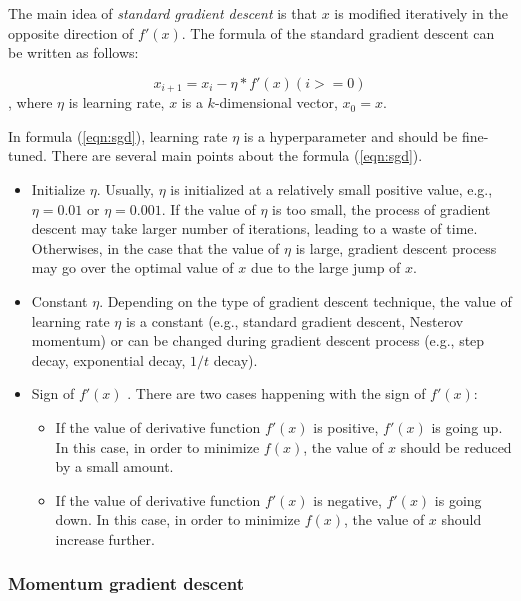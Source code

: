 \documentclass[12pt]{article}
\begin{document}
The main idea of \textit{standard gradient descent }is that $x$ is modified iteratively in the opposite direction of $f'(x)$. The formula of the standard gradient descent can be written as follows:

\begin{equation}
	\label{eqn:sgd}
	x_{i+1} = x_{i} - \eta * f'(x) (i >= 0)
\end{equation}
, where $\eta$ is learning rate, $x$ is a $k$-dimensional vector, $x_0 = x$.

In formula (\ref{eqn:sgd}), learning rate $\eta$ is a hyperparameter and should be fine-tuned. There are several main points about the formula (\ref{eqn:sgd}).

\begin{itemize}
	\item Initialize $\eta$.  Usually, $\eta$ is initialized at a relatively small positive value, e.g., $\eta = 0.01$ or $\eta = 0.001$. If the value of $\eta$ is too small, the process of gradient descent may take larger number of iterations, leading to a waste of time. Otherwises, in the case that the value of $\eta$ is large, gradient descent process may go over the optimal value of $x$ due to the large jump of $x$.
	\item Constant $\eta$. Depending on the type of gradient descent technique, the value of learning rate $\eta$ is a constant (e.g., standard gradient descent, Nesterov momentum) or can be changed during gradient descent process (e.g., step decay, exponential decay, $1/t$ decay).
	\item Sign of $f'(x)$ . There are two cases happening with the sign of $f'(x)$:
	
	\begin{itemize}
		\item If the value of derivative function $f'(x)$ is positive, $f'(x)$ is going up. In this case, in order to minimize $f(x)$, the value of $x$ should be reduced by a small amount.
		
		\item If the value of derivative function $f'(x)$ is negative, $f'(x)$ is going down. In this case, in order to minimize $f(x)$, the value of $x$ should increase further.
	\end{itemize}
\end{itemize}

\subsubsection{Momentum gradient descent}
\end{document}
